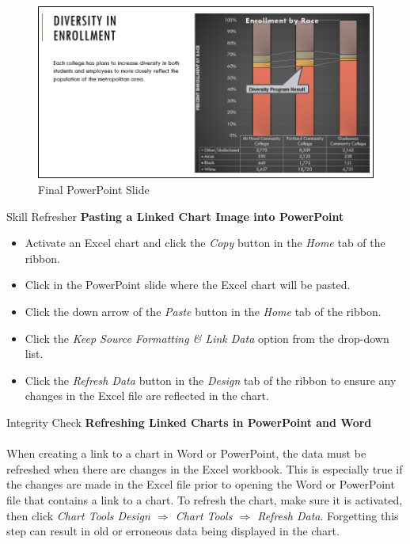 \begin{figure}[H]
	\centering
	\includegraphics[width=\maxwidth{.95\linewidth}]{gfx/ch04_fig51}
	\caption{Final PowerPoint Slide}
	\label{04:fig51}
\end{figure}

\begin{center}
	\begin{sklbox}{Skill Refresher}
		\textbf{Pasting a Linked Chart Image into PowerPoint}
		\\
		\begin{itemize}
			\setlength{\itemsep}{0pt}
			\setlength{\parskip}{0pt}
			\setlength{\parsep}{0pt}
			
			\item Activate an Excel chart and click the \textit{Copy} button in the \textit{Home} tab of the ribbon.
			\item Click in the PowerPoint slide where the Excel chart will be pasted.
			\item Click the down arrow of the \textit{Paste} button in the \textit{Home} tab of the ribbon.
			\item Click the \textit{Keep Source Formatting \& Link Data} option from the drop-down list.
			\item Click the \textit{Refresh Data} button in the \textit{Design} tab of the ribbon to ensure any changes in the Excel file are reflected in the chart.
			
		\end{itemize}
	\end{sklbox}
\end{center}

\begin{center}
	\begin{infobox}{Integrity Check}
		\textbf{Refreshing Linked Charts in PowerPoint and Word}
		\\
		\\
		When creating a link to a chart in Word or PowerPoint, the data must be refreshed when there are changes in the Excel workbook. This is especially true if the changes are made in the Excel file prior to opening the Word or PowerPoint file that contains a link to a chart. To refresh the chart, make sure it is activated, then click \textit{Chart Tools Design $ \Rightarrow $ Chart Tools $ \Rightarrow $ Refresh Data}. Forgetting this step can result in old or erroneous data being displayed in the chart.
	\end{infobox}
\end{center}

